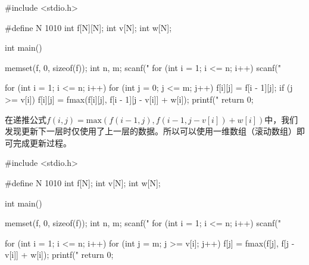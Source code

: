 \begin{mycpptwocol}[01背包问题]
    #include <stdio.h>

    #define N 1010
    int f[N][N];
    int v[N];
    int w[N];

    int main() {
        memset(f, 0, sizeof(f));
        int n, m;
        scanf("%
        for (int i = 1; i <= n; i++) {
            scanf("%
        }

        for (int i = 1; i <= n; i++) {
            for (int j = 0; j <= m; j++) {
                f[i][j] = f[i - 1][j];
                if (j >= v[i]) {
                    f[i][j] = fmax(f[i][j], f[i - 1][j - v[i]] + w[i]);
                }
            }
        }
        printf("%
        return 0;
    }
\end{mycpptwocol}

在递推公式$f(i, j) = \text{max}(f(i - 1, j), f(i - 1, j - v[i]) + w[i])$中，我们发现更新下一层时仅使用了上一层的数据。所以可以使用一维数组（滚动数组）即可完成更新过程。

\begin{mycpptwocol}[01背包问题]
    #include <stdio.h>

    #define N 1010
    int f[N];
    int v[N];
    int w[N];

    int main() {
        memset(f, 0, sizeof(f));
        int n, m;
        scanf("%
        for (int i = 1; i <= n; i++) {
            scanf("%
        }

        for (int i = 1; i <= n; i++) {
            for (int j = m; j >= v[i]; j++) {
                f[j] = fmax(f[j], f[j - v[i]] + w[i]);
            }
        }
        printf("%
        return 0;
    }
\end{mycpptwocol}


